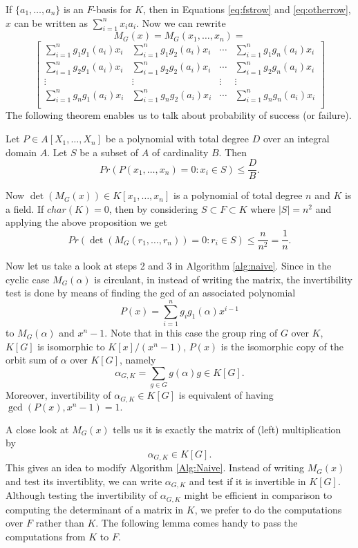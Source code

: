 \documentclass[sigconf]{acmart}
\newcommand{\osum}[2]{\alpha_{#1,#2}}
\theoremstyle{acmplain}
\begin{document}
 If $\lbrace a_1, \ldots , a_n \rbrace$ is an $F$-basis for $K$, then in Equations
   \ref{eq:fstrow} and \ref{eq:otherrow}, $x$ can be written as $\sum_{i = 1}^nx_i
    a_i$. Now we can rewrite 
    $$
M_G(x) = M_G(x_1,\ldots,x_n) =  $$
$$
\begin{bmatrix}
\sum_{i = 1}^n g_1 g_1(a_i)x_i & \sum_{i = 1}^n g_1 g_2(a_i)x_i & \cdots & 
\sum_{i = 1}^n g_1 g_n(a_i)x_i \\
\sum_{i = 1}^n g_2 g_1(a_i)x_i & \sum_{i = 1}^n g_2 g_2(a_i)x_i & \cdots & 
\sum_{i = 1}^n g_2 g_n(a_i)x_i \\
\vdots		& \vdots	& \vdots & \vdots \\
\sum_{i = 1}^n g_n g_1(a_i)x_i & \sum_{i = 1}^n g_n g_2(a_i)x_i & \cdots & 
\sum_{i = 1}^n g_n g_n(a_i)x_i \\
\end{bmatrix}    
    $$ 
 The following theorem enables us to talk about probability of success (or failure).
 \begin{proposition}\cite[Proposition 98]{Zippel} \label{thm:zippel}
Let $P \in A[X_1, \ldots, X_n]$ be a polynomial with total degree $D$ over an integral domain $A$. Let $S$ be a subset of $A$ of cardinality $B$. Then $$Pr(P(x_1, \ldots , x_n)=0:x_i \in S) \leq \dfrac{D}{B}.$$
\end{proposition}

Now $\det(M_G(x)) \in K[x_1, \ldots , x_n]$ is a polynomial of total degree $n$ and $K$ is a field. If $char(K) =0$, then by considering $S \subset F \subset K$ where $|S| = n^2$ and applying the above proposition we get $$Pr(\det(M_G(r_1,\ldots , r_n)) = 0 : r_i \in S)\leq \dfrac{n}{n^2}= \dfrac{1}{n}.$$
 
Now let us take a look at steps 2 and 3 in Algorithm \ref{alg:naive}. Since in the cyclic case $M_G(\alpha)$ is circulant,
 in \cite{Giesbrecht} instead of writing the matrix, the invertibility test is done by means of finding the gcd of an 
 associated polynomial 
$$P(x) = \sum_{i = 1}^n g_ig_1(\alpha)x^{i-1}$$ 
 to $M_G(\alpha)$ and $x^n-1$. Note that in this case the group ring of $G$ over $K$, $K[G]$ is isomorphic to $K[x]/(x^n-1)$,
 $P(x)$ is the isomorphic copy of the orbit sum of $\alpha$ over $K[G]$, namely
 $$\alpha_{G,K} = \sum_{g \in G} g(\alpha)g \in K[G].$$
 Moreover, invertibility of $\osum{G}{K}\in K[G]$ is equivalent of having $\gcd (P(x),x^n-1) =1.$
 
 A close look at $M_G(x)$ tells us it is exactly the matrix of (left) multiplication by $$\osum{G}{K} \in K[G].$$  This gives an idea to modify Algorithm \ref{Alg:Naive}. Instead of writing $M_G(x)$ and test its  invertiblity, 
 we can write $\osum{G}{K}$ and test if it is invertible in $K[G]$. Although testing the invertibility of $\osum{G}{K}$ might be efficient in
 comparison to computing the determinant of a matrix in $K$, we prefer to do the computations over $F$ rather than $K$. The  following lemma
 comes handy to pass the computations from $K$ to $F$.
\end{document}
